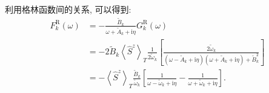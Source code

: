 利用格林函数间的关系, 可以得到:
\begin{align}
F_{k}^\mathrm{R}(\omega) &=-\frac{\tilde{B}_{k}}{\omega+\tilde{A}_k+\mathrm{i} \eta} G_{k}^\mathrm{R}(\omega)\nonumber \\
&=-2 \tilde{B}_{k}\left\langle\hat{S}^{z}\right\rangle_{T} \frac{1}{{2\tilde{\omega}_{k}}}\left[\frac{2\tilde{\omega}_{k}}{\left(\omega-\tilde{A}_{k}+\mathrm{i} \eta\right)\left(\omega+\tilde{A}_{k}+\mathrm{i} \eta\right)+\tilde{B}_k^{2}}\right] \nonumber\\
&=-\left\langle\hat{S}^{z}\right\rangle_{T} \frac{\tilde{B}_{k}}{\tilde{\omega}_{k}}\left[\frac{1}{\omega-\tilde{\omega}_{k}+\mathrm{i} \eta}-\frac{1}{\omega+\tilde{\omega}_{k}+\mathrm{i} \eta}\right].
\end{align}

